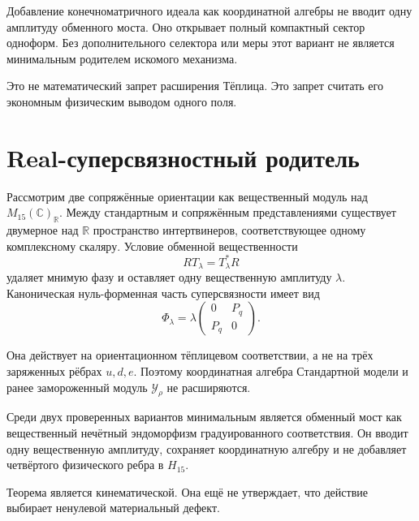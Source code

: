 \begin{proposition}
Добавление конечноматричного идеала как координатной алгебры не вводит одну
амплитуду обменного моста. Оно открывает полный компактный сектор одноформ.
Без дополнительного селектора или меры этот вариант не является
минимальным родителем искомого механизма.
\end{proposition}

Это не математический запрет расширения Тёплица. Это запрет считать его
экономным физическим выводом одного поля.

\section{Real-суперсвязностный родитель}

Рассмотрим две сопряжённые ориентации как вещественный модуль над
$M_{15}(\mathbb C)_{\mathbb R}$. Между стандартным и сопряжённым
представлениями существует двумерное над $\mathbb R$ пространство
интертвинеров, соответствующее одному комплексному скаляру. Условие
обменной вещественности
\begin{equation}
 RT_\lambda=T_\lambda^*R
\end{equation}
удаляет мнимую фазу и оставляет одну вещественную амплитуду $\lambda$.
Каноническая нуль-форменная часть суперсвязности имеет вид
\begin{equation}
 \Phi_\lambda=\lambda
 \begin{pmatrix}0&P_q\\P_q&0\end{pmatrix}.
 \label{eq:v6-real-bridge-superconnection-field}
\end{equation}

Она действует на ориентационном тёплицевом соответствии, а не на трёх
заряженных рёбрах $u,d,e$. Поэтому координатная алгебра Стандартной модели
и ранее замороженный модуль $\mathcal Y_\rho$ не расширяются.

\begin{theorem}
Среди двух проверенных вариантов минимальным является обменный мост как
вещественный нечётный эндоморфизм градуированного соответствия. Он вводит
одну вещественную амплитуду, сохраняет координатную алгебру и не добавляет
четвёртого физического ребра в $H_{15}$.
\end{theorem}

Теорема является кинематической. Она ещё не утверждает, что действие
выбирает ненулевой материальный дефект.

